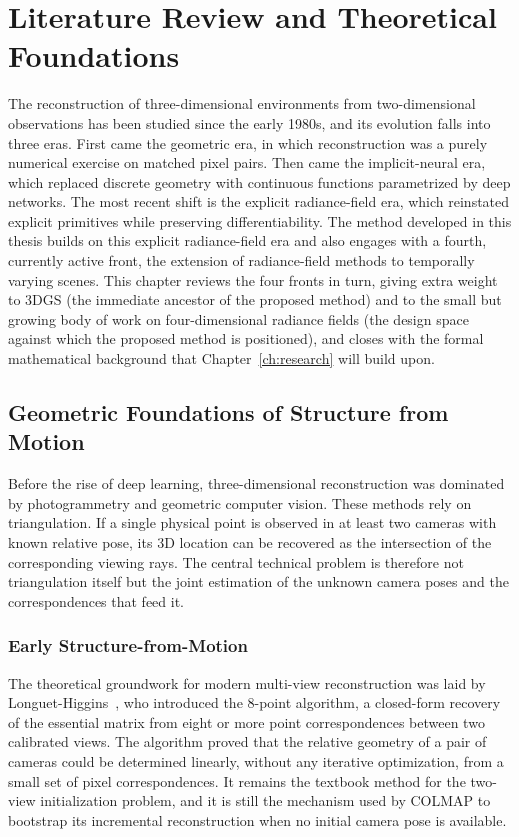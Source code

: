 \chapter{Literature Review and Theoretical Foundations}
\label{ch:literature}

The reconstruction of three-dimensional environments from two-dimensional
observations has been studied since the early 1980s, and its evolution falls
into three eras. First came the geometric era, in which
reconstruction was a purely numerical exercise on matched pixel pairs. Then came
the implicit-neural era, which replaced discrete geometry with continuous
functions parametrized by deep networks. The most recent shift is the explicit
radiance-field era, which reinstated explicit primitives while preserving
differentiability. The method developed in this thesis builds on this explicit
radiance-field era and also engages with a fourth, currently active front, the
extension of radiance-field methods to temporally varying scenes. This chapter reviews the four fronts in turn, giving extra weight to
3DGS (the immediate ancestor of the proposed method) and to the small but
growing body of work on four-dimensional radiance fields (the design space
against which the proposed method is positioned), and closes with the formal
mathematical background that Chapter~\ref{ch:research} will build upon.

\section{Geometric Foundations of Structure from Motion}

Before the rise of deep learning, three-dimensional reconstruction was dominated
by photogrammetry and geometric computer vision. These methods rely on
triangulation. If a single physical point is observed in at least two cameras
with known relative pose, its 3D location can be recovered as the intersection
of the corresponding viewing rays. The central technical problem is therefore
not triangulation itself but the joint estimation of the unknown camera poses
and the correspondences that feed it.

\subsection{Early Structure-from-Motion}

The theoretical groundwork for modern multi-view reconstruction was laid by
Longuet-Higgins~\cite{Longuet-Higgins1981}, who introduced the 8-point
algorithm, a closed-form recovery of the essential matrix from eight or more
point correspondences between two calibrated views. The algorithm proved that
the relative geometry of a pair of cameras could be determined linearly, without
any iterative optimization, from a small set of pixel correspondences. It
remains the textbook method for the two-view initialization problem, and it is
still the mechanism used by COLMAP to bootstrap its incremental reconstruction
when no initial camera pose is available.

